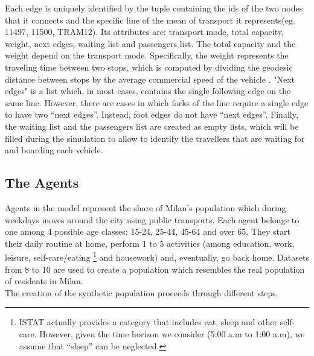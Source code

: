 Each edge is uniquely identified by the tuple containing the ids of the two nodes that it connects and the specific line of the mean of transport it represents(eg. 11497, 11500, TRAM12). Its attributes are: transport mode, total capacity, weight, next edges, waiting list and passengers list. The total capacity \cite{site13,site14,site15,site16} and the weight depend on the transport mode. Specifically, the weight represents the traveling time between two stops, which is computed by dividing the geodesic distance between stops by the average commercial speed of the vehicle \cite{site17}. "Next edges" is a list which, in most cases, contains the single following edge on the same line. However, there are cases in which forks of the line require a single edge to have two “next edges”. Instead, foot edges do not have “next edges”. Finally, the waiting list and the passengers list are created as empty lists, which will be filled during the simulation to allow to identify the travellers that are waiting for and boarding each vehicle. 


 \subsection{The Agents}\label{sec3}
 
Agents in the model represent the share of Milan's population which during weekdays moves around the city using public transports. Each agent belongs to one among 4 possible age classes: 15-24, 25-44, 45-64 and over 65. They start their daily routine at home, perform 1 to 5 activities (among education, work, leisure, self-care/eating \footnote{ISTAT actually provides a category that includes eat, sleep and other self-care. However, given the time horizon we consider (5:00 a.m  to 1:00 a.m), we assume that “sleep” can be neglected.} and housework) and, eventually, go back home. Datasets from 8 to 10 are used to create a population which resembles the real population of residents in Milan.  \\
The creation of the synthetic population proceeds through different steps.

